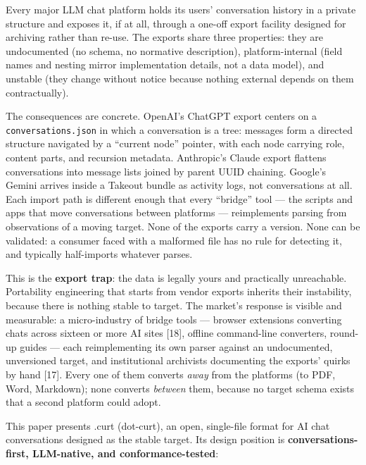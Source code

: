 \documentclass[11pt]{article}
\begin{document}
Every major LLM chat platform holds its users' conversation history in a private structure and exposes it, if at all, through a one-off export facility designed for archiving rather than re-use. The exports share three properties: they are undocumented (no schema, no normative description), platform-internal (field names and nesting mirror implementation details, not a data model), and unstable (they change without notice because nothing external depends on them contractually).

The consequences are concrete. OpenAI's ChatGPT export centers on a \texttt{conversations.json} in which a conversation is a tree: messages form a directed structure navigated by a ``current node'' pointer, with each node carrying role, content parts, and recursion metadata. Anthropic's Claude export flattens conversations into message lists joined by parent UUID chaining. Google's Gemini arrives inside a Takeout bundle as activity logs, not conversations at all. Each import path is different enough that every ``bridge'' tool --- the scripts and apps that move conversations between platforms --- reimplements parsing from observations of a moving target. None of the exports carry a version. None can be validated: a consumer faced with a malformed file has no rule for detecting it, and typically half-imports whatever parses.

This is the \textbf{export trap}: the data is legally yours and practically unreachable. Portability engineering that starts from vendor exports inherits their instability, because there is nothing stable to target. The market's response is visible and measurable: a micro-industry of bridge tools --- browser extensions converting chats across sixteen or more AI sites [18], offline command-line converters, round-up guides --- each reimplementing its own parser against an undocumented, unversioned target, and institutional archivists documenting the exports' quirks by hand [17]. Every one of them converts \emph{away} from the platforms (to PDF, Word, Markdown); none converts \emph{between} them, because no target schema exists that a second platform could adopt.

This paper presents .curt (dot-curt), an open, single-file format for AI chat conversations designed as the stable target. Its design position is \textbf{conversations-first, LLM-native, and conformance-tested}:
\end{document}
